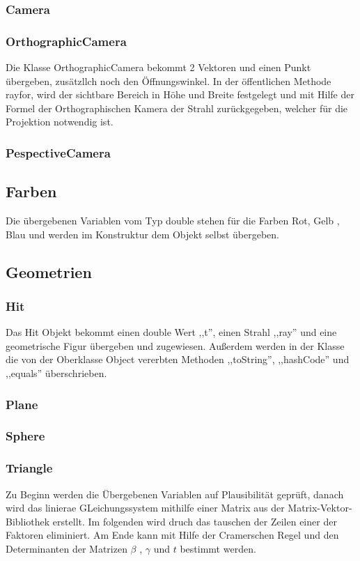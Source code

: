 \documentclass[14pt]{extarticle}
\begin{document}
\subsubsection{Camera}
\subsubsection{OrthographicCamera}
Die Klasse OrthographicCamera  bekommt 2 Vektoren und einen Punkt übergeben, zusätzllch noch den Öffnungswinkel. In der öffentlichen Methode rayfor, wird der sichtbare Bereich in Höhe und Breite festgelegt und mit Hilfe der Formel der Orthographischen Kamera der Strahl zurückgegeben, welcher für die Projektion notwendig ist.
\subsubsection{PespectiveCamera}
\subsection{Farben}
Die übergebenen Variablen vom Typ double stehen für die Farben Rot, Gelb , Blau und werden im Konstruktur dem Objekt selbst übergeben.
\subsection{Geometrien}

\subsubsection{Hit}
Das Hit Objekt bekommt einen double Wert ,,t'', einen Strahl ,,ray'' und eine geometrische Figur übergeben und zugewiesen. Außerdem werden in der Klasse die von der Oberklasse Object vererbten Methoden ,,toString'', ,,hashCode'' und ,,equals'' überschrieben.
\subsubsection{Plane}
\subsubsection{Sphere}
\subsubsection{Triangle}
Zu Beginn werden die Übergebenen Variablen auf Plausibilität geprüft, danach wird das linierae GLeichungssystem mithilfe einer Matrix aus der Matrix-Vektor-Bibliothek erstellt. Im folgenden wird druch das tauschen der Zeilen einer der Faktoren eliminiert. Am Ende kann mit Hilfe der Cramerschen Regel und den Determinanten der Matrizen $\beta$ , $\gamma$ und $t$ bestimmt werden.
\end{document}
